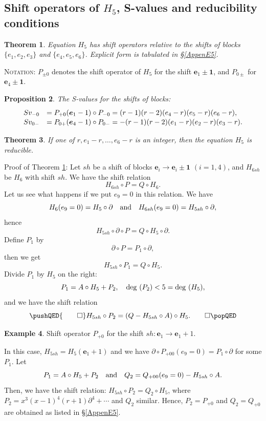 \documentclass[a4paper,12pt]{article}
\newtheorem{thm}{Theorem}[section]  %
\newtheorem{prp}[thm]{Proposition}
\theoremstyle{definition}
\newtheorem{example}[thm]{Example}
\theoremstyle{remark}
\numberwithin{equation}{section} %
\begin{document}
\subsection{Shift operators of $H_5$, S-values  and reducibility conditions}\label{E5Shift}

\begin{thm}\label{shiftopE5}
  Equation $H_5$ has shift operators relative to the shifts
  of blocks $\{e_1,e_2,e_3\}$ and  $\{e_4,e_5,e_6\}$.
  Explicit form is tabulated in \S \ref{AppenE5}.
\end{thm}
\noindent
\textsc{Notation}: $P_{\pm0}$ denotes the shift operator of $H_5$
for the shift ${{\bm e}_1}\pm{\bm 1}$,
and $P_{0\pm}$ for  ${{\bm e}_4}\pm{\bm 1}$.

\begin{prp}\label{SvalueE5} The S-values for the shifts of blocks:
\[ \def\arraystretch{1.1} \begin{array}{ll}
Sv_{-0}&=P_{+0}({\bm e}_1-1)\circ P_{-0}=(r-1)(r-2)(e_4-r)(e_5-r)(e_6-r),\\
Sv_{0-}&=P_{0+}({\bm e}_4-1)\circ P_{0-}= -(r-1)(r-2)(e_1-r)(e_2-r)(e_3-r).
\end{array}\]
\end{prp}

\begin{thm} \label{redcondE5}
  If one of $r, e_1-r, \dots, e_6-r$ is an integer,
  then the equation $H_5$ is reducible.
  \end{thm}

\noindent
{Proof of Theorem \ref{shiftopE5}}:
Let $sh$ be a shift of blocks ${\bm e}_i\to{\bm e}_i\pm{\bm1}$ $(i=1,4)$,
and $H_{6sh}$  be $H_6$ with shift $sh$. We have the shift relation
  \[ H_{6sh}\circ P = Q\circ H_6.\]
Let us see what happens if we put $e_9=0$ in this relation. We have
$$H_6(e_9=0)=H_5\circ \partial\quad{\rm and}
\quad H_{6sh}(e_9=0)=H_{5sh}\circ \partial,
$$
hence
$$H_{5sh}\circ \partial\circ P = Q\circ H_5\circ \partial.$$
Define $P_1$ by 
\[\partial\circ P = P_1\circ \partial,\]
then we get
\[H_{5sh}\circ P_1 = Q\circ H_5.\]
Divide $P_1$ by $H_5$ on the right:
\[P_1=A\circ H_5+P_2,\quad {\rm deg\ }(P_2)<5={\rm deg\ }(H_5),\]
and we have the shift relation 
\[\pushQED{\qed} H_{5sh}\circ P_2= (Q-H_{5sh}\circ A)\circ H_5.
\qedhere\popQED \]

\begin{example} Shift operator $P_{+0}$ for the shift $sh:{\bm e}_1\to{\bm e}_1+1.$\par\noindent
  In this case, $H_{5sh}=H_5({\bm e}_1+1)$
  and we have $\partial\circ P_{+00}(e_9=0) = P_1\circ \partial$
  for some $P_1$. Let
\[P_1=A\circ H_5+ P_2\quad{\rm and}\quad Q_2=Q_{+00}(e_9=0)-H_{5sh}\circ A.\]
Then, we have the shift relation: $H_{5sh}\circ P_2 = Q_2 \circ H_5$,
where $P_2= x^3(x-1)^4(r+1)\partial^4+\cdots$ and 
$Q_2$ similar. Hence, $P_2=P_{+0}$ and $Q_2=Q_{+0}$ are obtained
as listed in \S \ref{AppenE5}.
\end{example}
\end{document}
